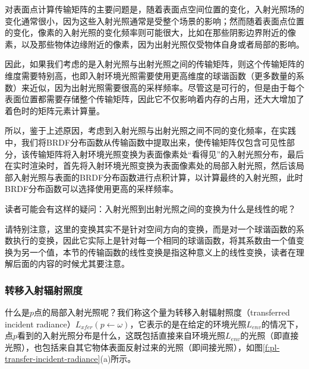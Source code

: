 对表面点计算传输矩阵的主要问题是，随着表面点空间位置的变化，入射光照场的变化通常很小，因为这些入射光照通常是受整个场景的影响；然而随着表面点位置的变化，像素的入射光照的变化频率则可能很大，比如在那些阴影边界附近的像素，以及那些物体边缘附近的像素，因为出射光照仅受物体自身或者局部的影响。

因此，如果我们考虑的是入射光照与出射光照之间的传输矩阵，则这个传输矩阵的维度需要特别高，也即入射环境光照需要使用更高维度的球谐函数（更多数量的系数）来近似，因为出射光照需要很高的采样频率。尽管这是可行的，但是由于每个表面位置都需要存储整个传输矩阵，因此它不仅影响着内存的占用，还大大增加了着色时的矩阵元素计算量。

所以，鉴于上述原因，考虑到入射光照与出射光照之间不同的变化频率，在实践中，我们将BRDF分布函数从传输函数中提取出来，使传输矩阵仅包含可见性部分，该传输矩阵将入射环境光照变换为表面像素处“看得见”的入射光照分布，最后在实时渲染时，首先将入射环境光照变换为表面像素处的局部入射光照，然后该局部入射光照与表面的BRDF分布函数进行点积计算，以计算最终的入射光照，此时BRDF分布函数可以选择使用更高的采样频率。

\begin{myshaded}
	读者可能会有这样的疑问：入射光照到出射光照之间的变换为什么是线性的呢？
	
	请特别注意，这里的变换其实不是针对空间方向的变换，而是对一个球谐函数的系数执行的变换，因此它实际上是针对每一个相同的球谐函数，将其系数由一个值变换为另一个值，本节的传输函数的线性变换是指这种意义上的线性变换，读者在理解后面的内容的时候尤其要注意。
\end{myshaded}




\subsubsection{转移入射辐射照度}
什么是$p$点的局部入射光照呢？我们称这个量为转移入射辐射照度（transferred incident radiance）$L_{xfer}(p\leftarrow \omega)$，它表示的是在给定的环境光照$L_{env}$的情况下，点$p$看到的入射光照分布是什么，这既包括直接来自环境光照$L_{env}$的光照（即直接光照），也包括来自其它物体表面反射过来的光照（即间接光照），如图\ref{f:pl-transfer-incident-radiance}(a)所示。

